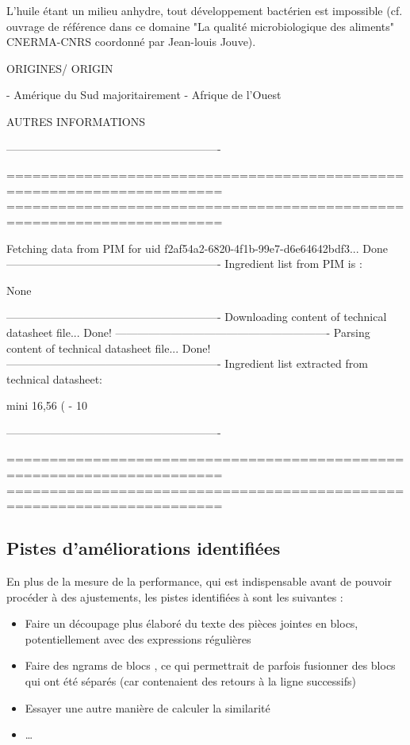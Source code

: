 \begin{spacing}{1.0}
{{\begin{spverbatim}
L’huile étant un milieu anhydre, tout développement bactérien est impossible (cf. ouvrage de 
référence  dans  ce  domaine  "La  qualité  microbiologique  des  aliments"  CNERMA-CNRS 
coordonné par Jean-louis Jouve). 
    
ORIGINES/ ORIGIN 
    
- Amérique du Sud majoritairement 
- Afrique de l’Ouest 
    
AUTRES INFORMATIONS 
    

----------------------------------------------------------

=======================================================================
=======================================================================

Fetching data from PIM for uid f2af54a2-6820-4f1b-99e7-d6e64642bdf3...
Done
----------------------------------------------------------
Ingredient list from PIM is :

None

----------------------------------------------------------
Downloading content of technical datasheet file...
Done!
----------------------------------------------------------
Parsing content of technical datasheet file...
Done!
----------------------------------------------------------
Ingredient list extracted from technical datasheet:

mini 16,56 ( - 10 %

----------------------------------------------------------

=======================================================================
=======================================================================  
                \end{spverbatim}
                }
                }
                \end{spacing}

            \subsection{Pistes d'améliorations identifiées}

            En plus de la mesure de la performance, qui est indispensable avant de pouvoir procéder à des ajustements, les pistes identifiées à sont les suivantes :
            \begin{itemize}
                \item Faire un découpage plus élaboré du texte des pièces jointes en blocs, potentiellement avec des expressions régulières
                \item Faire des \og ngrams de blocs \og, ce qui permettrait de parfois fusionner des blocs qui ont été séparés (car contenaient des retours à la ligne successifs)
                \item Essayer une autre manière de calculer la similarité
                \item \dots
            \end{itemize}

